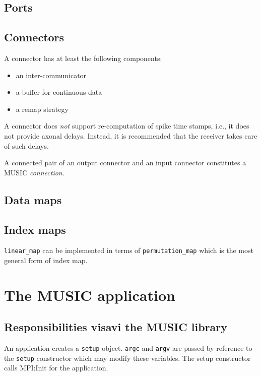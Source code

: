 \documentclass[a4paper]{report}
\begin{document}
\begin{metatext}
\subsection{Ports}

\subsection{Connectors}

A connector has at least the following components:
\begin{itemize}
  \item an inter-communicator
  \item a buffer for continuous data
  \item a remap strategy
\end{itemize}

A connector does \emph{not} support re-computation of spike time
stamps, i.e., it does not provide axonal delays.  Instead, it is
recommended that the receiver takes care of such delays.

A connected pair of an output connector and an input connector
constitutes a MUSIC \emph{connection}.

\subsection{Data maps}

\subsection{Index maps}

\lstinline|linear_map| can be implemented in terms of
\lstinline|permutation_map| which is the most general form of index map.

\section{The MUSIC application}

\subsection{Responsibilities visavi the MUSIC library}
\label{sec:responsibilities}

An application creates a \lstinline|setup| object.  \lstinline|argc|
and \lstinline|argv| are passed by reference to the \lstinline|setup|
constructor which may modify these variables.  The setup constructor
calls MPI:Init for the application.


\end{metatext}
\end{document}
